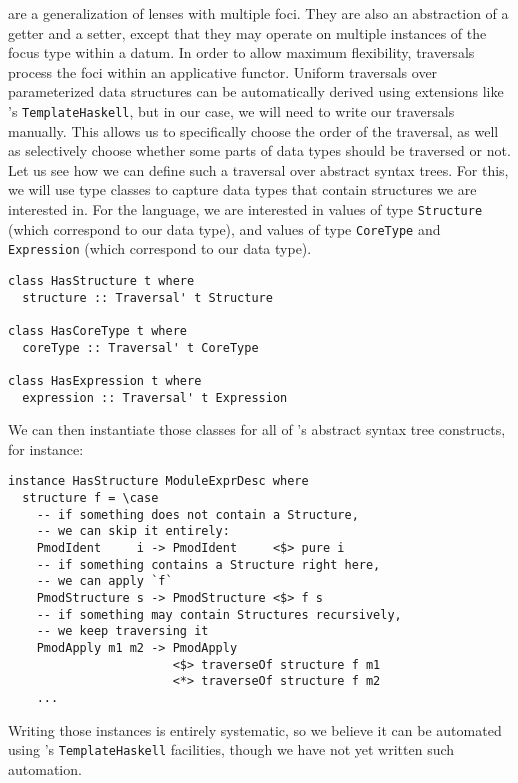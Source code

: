 are a generalization of lenses with multiple foci.  They are
also an abstraction of a getter and a setter, except that they may operate on
multiple instances of the focus type within a datum.  In order to allow maximum
flexibility, traversals process the foci within an applicative functor.  Uniform
traversals over parameterized data structures can be automatically derived using
extensions like \Haskell{}'s \texttt{TemplateHaskell}, but in our
case, we will need to write our traversals manually.  This allows us to
specifically choose the order of the traversal, as well as selectively choose
whether some parts of data types should be traversed or not.  Let us see how we
can define such a traversal over \OCaml{} abstract syntax trees.  For this, we
will use type classes to capture data types that contain structures we are
interested in.  For the \OCaml{} language, we are interested in values of type
\texttt{Structure} (which correspond to our 
data type), and values of type \texttt{CoreType} and
\texttt{Expression} (which correspond to our  data
type).

\begin{verbatim}
class HasStructure t where
  structure :: Traversal' t Structure

class HasCoreType t where
  coreType :: Traversal' t CoreType

class HasExpression t where
  expression :: Traversal' t Expression
\end{verbatim}

We can then instantiate those classes for all of \OCaml{}'s abstract syntax tree
constructs, for instance:

\begin{verbatim}
instance HasStructure ModuleExprDesc where
  structure f = \case
    -- if something does not contain a Structure,
    -- we can skip it entirely:
    PmodIdent     i -> PmodIdent     <$> pure i
    -- if something contains a Structure right here,
    -- we can apply `f`
    PmodStructure s -> PmodStructure <$> f s
    -- if something may contain Structures recursively,
    -- we keep traversing it
    PmodApply m1 m2 -> PmodApply
                       <$> traverseOf structure f m1
                       <*> traverseOf structure f m2
    ...
\end{verbatim}

\noindent Writing those instances is entirely systematic, so we believe it can
be automated using \Haskell{}'s \texttt{TemplateHaskell}
facilities, though we have not yet written such automation.


